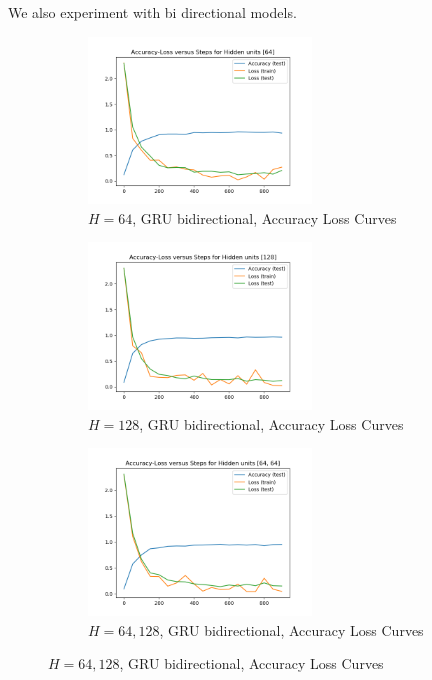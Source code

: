 We also experiment with bi directional models.

\begin{figure}[!htbp]
\begin{subfigure}
\centering
\includegraphics[angle=0,width=0.65\textwidth]{assign-3/logs/Q1-MNIST-GRU-[64].png}
\caption{$H=64$, GRU bidirectional, Accuracy Loss Curves}
\end{subfigure}
\begin{subfigure}
\centering
\includegraphics[angle=0,width=0.65\textwidth]{assign-3/logs/Q1-MNIST-GRU-[128].png}
\caption{$H=128$, GRU bidirectional, Accuracy Loss Curves}
\end{subfigure}
\begin{subfigure}
\centering
\includegraphics[angle=0,width=0.65\textwidth]{assign-3/logs/Q1-MNIST-GRU-[64, 64].png}
\caption{$H=64, 128$, GRU bidirectional, Accuracy Loss Curves}
\end{subfigure}
\end{figure}

